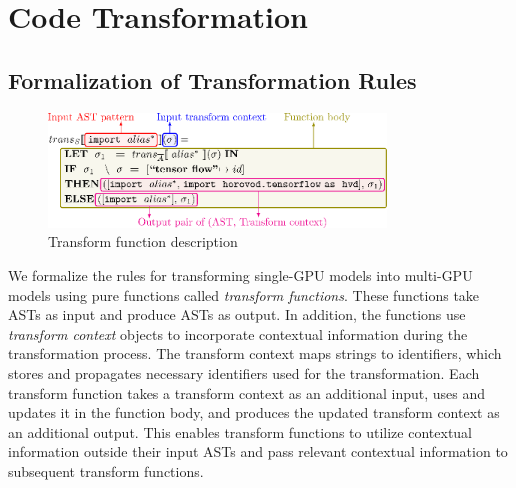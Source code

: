 \section{Code Transformation}\label{sec:trans}

\subsection{Formalization of Transformation Rules}

\begin{figure}[ht!]
    \centering
    \includegraphics[width=0.8\textwidth]{Fig14.eps}
    \caption{Transform function description}
    \label{fig:trans:fnexpl}
\end{figure}

\noindent
We formalize the rules for transforming single-GPU models into multi-GPU
models using pure functions called {\it transform functions}. 
These functions take ASTs as input and produce ASTs as output. 
In addition, the functions use {\it transform context} objects to incorporate
contextual information during the transformation process. 
The transform context maps strings to identifiers, which stores and
propagates necessary identifiers used for the transformation.
Each transform function takes a transform context as an additional input, uses
and updates it in the function body, and produces the updated transform context
as an additional output.
This enables transform functions to utilize contextual information outside
their input ASTs and pass relevant contextual information to subsequent
transform functions.

